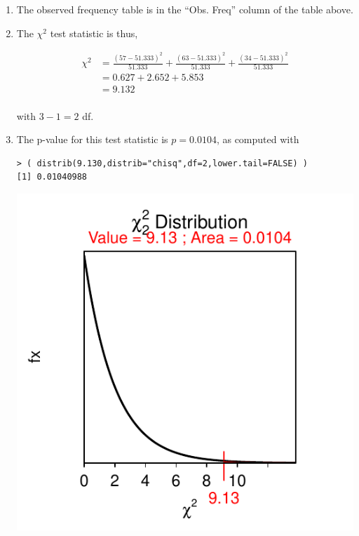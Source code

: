 \documentclass[10pt,openany]{book}\usepackage[]{graphicx}\usepackage[]{color}
\makeatletter
\newenvironment{kframe}{%
 \def\at@end@of@kframe{}%
 \ifinner\ifhmode%
  \def\at@end@of@kframe{\end{minipage}}%
  \begin{minipage}{\columnwidth}%
 \fi\fi%
 \def\FrameCommand##1{\hskip\@totalleftmargin \hskip-\fboxsep
 \colorbox{shadecolor}{##1}\hskip-\fboxsep
     \hskip-\linewidth \hskip-\@totalleftmargin \hskip\columnwidth}%
 \MakeFramed {\advance\hsize-\width
   \@totalleftmargin\z@ \linewidth\hsize
   \@setminipage}}%
 {\par\unskip\endMakeFramed%
 \at@end@of@kframe}
\newenvironment{knitrout}{}{} %
\makeatother
\begin{document}
\begin{itemize}
\begin{enumerate}
\begin{center}
        \end{center}
    \item The observed frequency table is in the ``Obs. Freq'' column of the table above.
    \item The $\chi^{2}$ test statistic is thus,
      \begin{center}
        \[  \begin{split}
          \chi^{2} &= \frac{(57-51.333)^{2}}{51.333} + \frac{(63-51.333)^{2}}{51.333} + \frac{(34-51.333)^{2}}{51.333} \\
          &= 0.627 + 2.652 + 5.853 \\
          & = 9.132 \\
        \end{split}  \]
      \end{center}
      with $3-1=2$ df.
    \item The p-value for this test statistic is $p=0.0104$, as computed with
\begin{knitrout}
\color{fgcolor}\begin{kframe}
\begin{verbatim}
> ( distrib(9.130,distrib="chisq",df=2,lower.tail=FALSE) )
[1] 0.01040988
\end{verbatim}
\end{kframe}

{\centering \includegraphics[width=.4\linewidth]{Figs/unnamed-chunk-401-1} 

}




\end{knitrout}
\end{enumerate}
\end{itemize}
\end{document}
